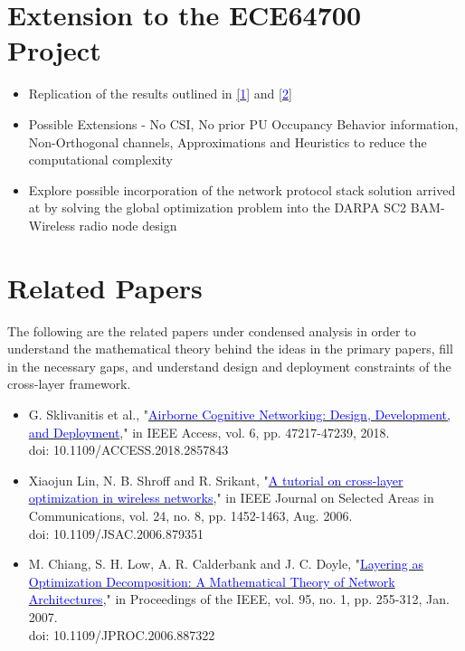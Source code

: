 \documentclass[12pt, draftcls, onecolumn]{IEEEtran}
\begin{document}
\section{Extension to the ECE64700 Project}
\begin{itemize}
    \item Replication of the results outlined in \href{http://ieeexplore.ieee.org/stamp/stamp.jsp?tp=&arnumber=7859326&isnumber=7859429}{[\textcolor{blue}{1}]} and \href{http://ieeexplore.ieee.org/stamp/stamp.jsp?tp=&arnumber=6881740&isnumber=7180482}{[\textcolor{blue}{2}]}
    \item Possible Extensions - No CSI, No prior PU Occupancy Behavior information, Non-Orthogonal channels, Approximations and Heuristics to reduce the computational complexity
    \item Explore possible incorporation of the network protocol stack solution arrived at by solving the global optimization problem into the DARPA SC2 BAM-Wireless radio node design
\end{itemize}
\section{Related Papers}
The following are the related papers under condensed analysis in order to understand the mathematical theory behind the ideas in the primary papers, fill in the necessary gaps, and understand design and deployment constraints of the cross-layer framework.
\begin{itemize}
    \item G. Sklivanitis et al., "\href{http://ieeexplore.ieee.org/stamp/stamp.jsp?tp=&arnumber=8416696&isnumber=8274985}{\textcolor{blue}{Airborne Cognitive Networking: Design, Development, and Deployment}}," in IEEE Access, vol. 6, pp. 47217-47239, 2018.
    \\doi: 10.1109/ACCESS.2018.2857843
    \item Xiaojun Lin, N. B. Shroff and R. Srikant, "\href{http://ieeexplore.ieee.org/stamp/stamp.jsp?tp=&arnumber=1665000&isnumber=34851}{\textcolor{blue}{A tutorial on cross-layer optimization in wireless networks}}," in IEEE Journal on Selected Areas in Communications, vol. 24, no. 8, pp. 1452-1463, Aug. 2006.
    \\doi: 10.1109/JSAC.2006.879351
    \item M. Chiang, S. H. Low, A. R. Calderbank and J. C. Doyle, "\href{http://ieeexplore.ieee.org/stamp/stamp.jsp?tp=&arnumber=4118456&isnumber=4118453}{\textcolor{blue}{Layering as Optimization Decomposition: A Mathematical Theory of Network Architectures}}," in Proceedings of the IEEE, vol. 95, no. 1, pp. 255-312, Jan. 2007.
    \\doi: 10.1109/JPROC.2006.887322
\end{itemize}
\end{document}
